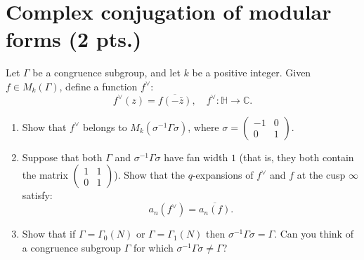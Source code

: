 \documentclass[paper=a4, fontsize=11pt]{scrartcl} %
\numberwithin{equation}{section} %
\numberwithin{figure}{section} %
\numberwithin{table}{section} %
\newcommand{\bbC}{\mathbb{C}}
\newcommand{\bbZ}{\mathbb{Z}}
\newcommand{\bbH}{\mathbb{H}}
\newcommand{\CC}{\bbC}
\newcommand{\HH}{\bbH}
\newcommand{\ZZ}{\bbZ}
\newcommand{\smtx}[4]{\left(\begin{smallmatrix}#1&#2\\#3&#4\end{smallmatrix}\right)}
\newcommand{\ol}[1]{\overline{#1}}
\begin{document}
\section{Complex conjugation of modular forms (2 pts.)}
Let $\Gamma$ be a congruence subgroup, and let $k$ be a positive integer. Given $f\in M_k(\Gamma)$, define a function $f^\vee$:
\[
f^\vee(z)=\ol{f(-\bar z)},\quad f^\vee\colon \HH\to \CC.
\]
\begin{enumerate}
\item Show that $f^\vee$ belongs to $M_k(\sigma^{-1}\Gamma\sigma)$, where $\sigma=\smtx{-1}001$.
\item Suppose that both $\Gamma$ and $\sigma^{-1}\Gamma\sigma$ have fan width $1$ (that is, they both contain the matrix $\smtx 1101$). Show that the $q$-expansions of $f^\vee$ and $f$ at the cusp $\infty$ satisfy:
\[
a_n(f^\vee)=\ol{a_n(f)}.
\]
\item Show that if $\Gamma=\Gamma_0(N)$ or $\Gamma=\Gamma_1(N)$ then $\sigma^{-1}\Gamma\sigma=\Gamma$. Can you think of a congruence subgroup $\Gamma$ for which $\sigma^{-1}\Gamma\sigma\neq \Gamma$?
\end{enumerate}
\end{document}
